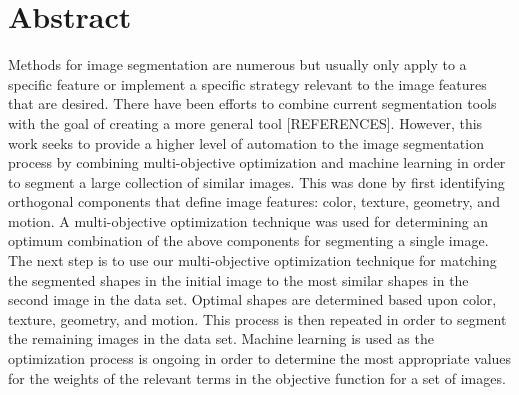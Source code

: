 \section{Abstract}
Methods for image segmentation are numerous but usually only apply to a specific feature or implement a specific strategy relevant to the image features that are desired. There have been efforts to combine current segmentation tools with the goal of creating a more general tool [REFERENCES]. However, this work seeks to provide a higher level of automation to the image segmentation process by combining multi-objective optimization and machine learning in order to segment a large collection of similar images. This was done by first identifying orthogonal components that define image features: color, texture, geometry, and motion. A multi-objective optimization technique was used for determining an optimum combination of the above components for segmenting a single image. The next step is to use our multi-objective optimization technique for matching the segmented shapes in the initial image to the most similar shapes in the second image in the data set. Optimal shapes are determined based upon color, texture, geometry, and motion. This process is then repeated in order to segment the remaining images in the data set. Machine learning is used as the optimization process is ongoing in order to determine the most appropriate values for the weights of the relevant terms in the objective function for a set of images.
